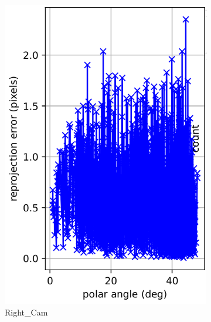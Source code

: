 \documentclass{article}
\begin{document}
\begin{figure}
\begin{subfigure}[b]{0.3\textwidth}
         \includegraphics[width=\textwidth]{cam2polar.png}
         \caption{Right\_Cam}
     \end{subfigure}
        \caption{Polar Reprojection error}
    \hfill
     \begin{subfigure}[b]{0.3\textwidth}
         \centering

\end{subfigure}
\end{figure}
\end{document}
